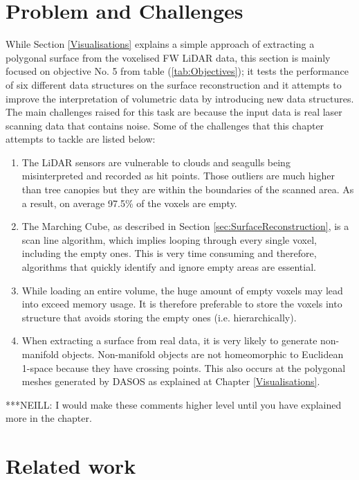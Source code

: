 \documentclass{subfiles}
\begin{document}
	
\section{Problem and Challenges}\label{sec:Opt:Challenges}
	
	\par While Section \ref{Visualisations} explains a simple approach of extracting a polygonal surface from the voxelised FW LiDAR data, this section is mainly focused on objective No. 5 from table (\ref{tab:Objectives}); it tests the performance of six different data structures on the surface reconstruction and it attempts to improve the interpretation of volumetric data by introducing new data structures. The main challenges raised for this task are because the input data is real laser scanning data that contains noise. Some of the challenges that this chapter attempts to tackle are listed below:
  \begin{enumerate}
		\item The LiDAR sensors are vulnerable to clouds and seagulls being misinterpreted and recorded as hit points. Those outliers are much higher than tree canopies but they are within the boundaries of the scanned area. As a result, on average 97.5\% of the voxels are empty.   	
		\item The Marching Cube, {\color{blue}as described in Section \ref{sec:SurfaceReconstruction}}, is a scan line algorithm, which implies looping through every single voxel, including the empty ones. This is very time consuming and therefore, algorithms that quickly identify and ignore empty areas are essential. 
		\item While loading an entire volume, the huge amount of empty voxels may lead into exceed memory usage. It is therefore preferable to store the voxels into structure that avoids storing the empty ones (i.e. hierarchically).
		\item When extracting a surface from real data, it is very likely to generate non-manifold objects. Non-manifold objects are not homeomorphic to Euclidean 1-space because they have crossing points. This also occurs at the polygonal meshes generated by DASOS as explained at Chapter \ref{Visualisations}.
	\end{enumerate}
	
	{\color{red} ***NEILL: I would make these comments higher level until you have explained more in the chapter. }

	


\section{Related work}
\end{document}
